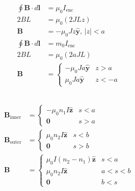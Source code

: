 \documentclass{article}
\renewcommand{\vec}[1]{\boldsymbol{\mathbf{#1}}}
\newcommand{\uvec}[1]{\hat{\vec{#1}}}
\begin{document}
\begin{align*}
  \oint \vec{B} \cdot d \vec{l} & = \mu_0 I_\text{enc}             \\
  2 B L                         & = \mu_0 (2 J L z)                \\
  \vec{B}                       & = -\mu_0 J z \uvec{y}, \,|z| < a \\
  \oint \vec{B} \cdot d \vec{l} & = m_0 I_\text{enc}               \\
  2 B L                         & = \mu_0 (2 a J L)                \\
  \vec{B}                       & = \begin{cases}
                                      -\mu_0 J a \uvec{y} & z > a  \\
                                      \mu_0 J a \uvec{y}  & z < -a
                                    \end{cases}
\end{align*}

\subsection{}

\begin{align*}
  \vec{B}_\text{inner} & = \begin{cases}
                             -\mu_0 n_1 I \uvec{z} & s < a \\
                             \vec{0}               & s > a
                           \end{cases}            \\
  \vec{B}_\text{outer} & = \begin{cases}
                             \mu_0 n_2 I \uvec{z} & s < b \\
                             \vec{0}              & s > b
                           \end{cases}             \\
  \vec{B}              & = \begin{cases}
                             \mu_0 I (n_2 - n_1) \uvec{z} & s < a     \\
                             \mu_0 n_2 I \uvec{z}         & a < s < b \\
                             \vec{0}                      & b < s
                           \end{cases}
\end{align*}
\end{document}
